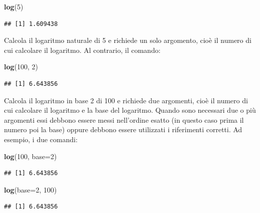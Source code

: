 \documentclass[a4paper,12pt,oneside]{book}
\newenvironment{Shaded}{\begin{snugshade}}{\end{snugshade}}
\newcommand{\KeywordTok}[1]{\textcolor[rgb]{0.13,0.29,0.53}{\textbf{#1}}}
\newcommand{\DataTypeTok}[1]{\textcolor[rgb]{0.13,0.29,0.53}{#1}}
\newcommand{\DecValTok}[1]{\textcolor[rgb]{0.00,0.00,0.81}{#1}}
\newcommand{\NormalTok}[1]{#1}
\begin{document}
\begin{Shaded}
\begin{Highlighting}[]
\KeywordTok{log}\NormalTok{(}\DecValTok{5}\NormalTok{)}
\end{Highlighting}
\end{Shaded}

\begin{verbatim}
## [1] 1.609438
\end{verbatim}

Calcola il logaritmo naturale di 5 e richiede un solo argomento, cioè il
numero di cui calcolare il logaritmo. Al contrario, il comando:

\begin{Shaded}
\begin{Highlighting}[]
\KeywordTok{log}\NormalTok{(}\DecValTok{100}\NormalTok{, }\DecValTok{2}\NormalTok{)}
\end{Highlighting}
\end{Shaded}

\begin{verbatim}
## [1] 6.643856
\end{verbatim}

Calcola il logaritmo in base 2 di 100 e richiede due argomenti, cioè il
numero di cui calcolare il logaritmo e la base del logaritmo. Quando
sono necessari due o più argomenti essi debbono essere messi nell'ordine
esatto (in questo caso prima il numero poi la base) oppure debbono
essere utilizzati i riferimenti corretti. Ad esempio, i due comandi:

\begin{Shaded}
\begin{Highlighting}[]
\KeywordTok{log}\NormalTok{(}\DecValTok{100}\NormalTok{, }\DataTypeTok{base=}\DecValTok{2}\NormalTok{)}
\end{Highlighting}
\end{Shaded}

\begin{verbatim}
## [1] 6.643856
\end{verbatim}

\begin{Shaded}
\begin{Highlighting}[]
\KeywordTok{log}\NormalTok{(}\DataTypeTok{base=}\DecValTok{2}\NormalTok{, }\DecValTok{100}\NormalTok{)}
\end{Highlighting}
\end{Shaded}

\begin{verbatim}
## [1] 6.643856
\end{verbatim}
\end{document}
